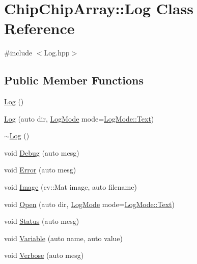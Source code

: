 \hypertarget{classChipChipArray_1_1Log}{\section{Chip\+Chip\+Array\+:\+:Log Class Reference}
\label{classChipChipArray_1_1Log}
}


{\ttfamily \#include $<$Log.\+hpp$>$}

\subsection*{Public Member Functions}
\begin{DoxyCompactItemize}
\item 
\hyperlink{classChipChipArray_1_1Log_a2bd48afdb832567e94545e6dc2f6f4d5}{Log} ()
\item 
\hyperlink{classChipChipArray_1_1Log_a4cd28a821789b39e936a6e346329d65b}{Log} (auto dir, \hyperlink{definitions_8hpp_aa7380b6d694cab49f07aed6a7af592d9}{Log\+Mode} mode=\hyperlink{definitions_8hpp_aa7380b6d694cab49f07aed6a7af592d9a9dffbf69ffba8bc38bc4e01abf4b1675}{Log\+Mode\+::\+Text})
\item 
\hyperlink{classChipChipArray_1_1Log_a647df4da22b29d9d5a5ea32af3a1ed83}{$\sim$\+Log} ()
\item 
void \hyperlink{classChipChipArray_1_1Log_ac32b435af1577e4ebc67af2bdfea8eff}{Debug} (auto mesg)
\item 
void \hyperlink{classChipChipArray_1_1Log_aba7b7b0555f49f4dcf15f4b9fd3e6b34}{Error} (auto mesg)
\item 
void \hyperlink{classChipChipArray_1_1Log_a65bbab057c8b1453f9e4efcfee7522c4}{Image} (cv\+::\+Mat image, auto filename)
\item 
void \hyperlink{classChipChipArray_1_1Log_ad27a06a4561f2f59159bd8a7fc2fed3b}{Open} (auto dir, \hyperlink{definitions_8hpp_aa7380b6d694cab49f07aed6a7af592d9}{Log\+Mode} mode=\hyperlink{definitions_8hpp_aa7380b6d694cab49f07aed6a7af592d9a9dffbf69ffba8bc38bc4e01abf4b1675}{Log\+Mode\+::\+Text})
\item 
void \hyperlink{classChipChipArray_1_1Log_a66575b6e94c6112e4cefa5736cb996e0}{Status} (auto mesg)
\item 
void \hyperlink{classChipChipArray_1_1Log_a8849569720c26e335e7ef4dcb912170b}{Variable} (auto name, auto value)
\item 
void \hyperlink{classChipChipArray_1_1Log_a154a5f38d9c7a767693b242684a3d4d9}{Verbose} (auto mesg)
\end{DoxyCompactItemize}


